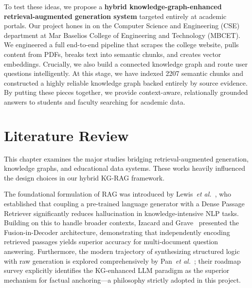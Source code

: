 \documentclass[12pt,a4paper]{report}
\begin{document}
\par
To test these ideas, we propose a \textbf{hybrid knowledge-graph-enhanced retrieval-augmented generation system} targeted entirely at academic portals. Our project hones in on the Computer Science and Engineering (CSE) department at Mar Baselios College of Engineering and Technology (MBCET). We engineered a full end-to-end pipeline that scrapes the college website, pulls content from PDFs, breaks text into semantic chunks, and creates vector embeddings. Crucially, we also build a connected knowledge graph and route user questions intelligently. At this stage, we have indexed 2207 semantic chunks and constructed a highly reliable knowledge graph backed entirely by source evidence. By putting these pieces together, we provide context-aware, relationally grounded answers to students and faculty searching for academic data.

\clearpage

\chapter{Literature Review}

This chapter examines the major studies bridging retrieval-augmented generation, knowledge graphs, and educational data systems. These works heavily influenced the design choices in our hybrid KG-RAG framework.

\par
The foundational formulation of RAG was introduced by Lewis~\textit{et al.}~\cite{lewis2020}, who established that coupling a pre-trained language generator with a Dense Passage Retriever significantly reduces hallucination in knowledge-intensive NLP tasks. Building on this to handle broader contexts, Izacard and Grave~\cite{izacard2021} presented the Fusion-in-Decoder architecture, demonstrating that independently encoding retrieved passages yields superior accuracy for multi-document question answering. Furthermore, the modern trajectory of synthesizing structured logic with raw generation is explored comprehensively by Pan~\textit{et al.}~\cite{pan2024}; their roadmap survey explicitly identifies the KG-enhanced LLM paradigm as the superior mechanism for factual anchoring—a philosophy strictly adopted in this project.
\end{document}
